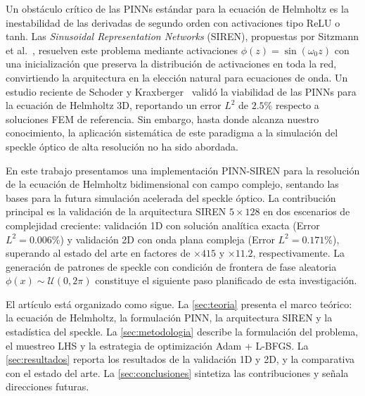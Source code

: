Un obstáculo crítico de las PINNs estándar para la ecuación de Helmholtz es la inestabilidad
de las derivadas de segundo orden con activaciones tipo ReLU o tanh.
Las \textit{Sinusoidal Representation Networks} (SIREN), propuestas por
Sitzmann et al.~\cite{Sitzmann2020_SIREN}, resuelven este problema mediante activaciones
$\phi(z) = \sin(\omega_0 z)$ con una inicialización que preserva la distribución de
activaciones en toda la red, convirtiendo la arquitectura en la elección natural para
ecuaciones de onda.
Un estudio reciente de Schoder y Kraxberger~\cite{Schoder2024_PINN_acoustics} validó la viabilidad de las PINNs
para la ecuación de Helmholtz 3D, reportando un error $L^2$ de $2.5\%$ respecto a soluciones
FEM de referencia.
Sin embargo, hasta donde alcanza nuestro conocimiento, la aplicación sistemática de este
paradigma a la simulación del speckle óptico de alta resolución no ha sido abordada.

En este trabajo presentamos una implementación PINN-SIREN para la resolución de la ecuación
de Helmholtz bidimensional con campo complejo, sentando las bases para la futura simulación
acelerada del speckle óptico.
La contribución principal es la validación de la arquitectura SIREN $5\times128$ en dos
escenarios de complejidad creciente: validación 1D con solución analítica exacta
(Error $L^2 = 0.006\%$) y validación 2D con onda plana compleja (Error $L^2 = 0.171\%$),
superando al estado del arte en factores de $\times 415$ y $\times 11.2$, respectivamente.
La generación de patrones de speckle con condición de frontera de fase aleatoria
$\phi(x) \sim \mathcal{U}(0, 2\pi)$ constituye el siguiente paso planificado de esta investigación.

El artículo está organizado como sigue.
La \cref{sec:teoria} presenta el marco teórico: la ecuación de Helmholtz, la formulación PINN,
la arquitectura SIREN y la estadística del speckle.
La \cref{sec:metodologia} describe la formulación del problema, el muestreo LHS y la
estrategia de optimización Adam + L-BFGS.
La \cref{sec:resultados} reporta los resultados de la validación 1D y 2D, y la comparativa
con el estado del arte.
La \cref{sec:conclusiones} sintetiza las contribuciones y señala direcciones futuras.
